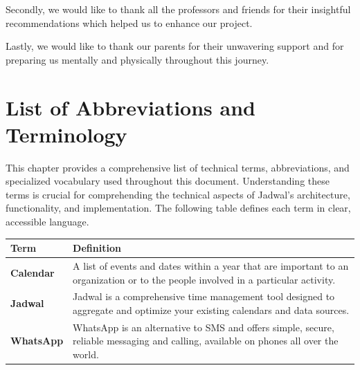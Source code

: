 \documentclass[12pt,a4paper]{report}
\begin{document}
\begin{singlespace}
\begin{justify}
        Secondly, we would like to thank all the professors and friends for their insightful recommendations which helped us to enhance our project.

        Lastly, we would like to thank our parents for their unwavering support and for preparing us mentally and physically throughout this journey.
    \end{justify}

    \newpage

    \tableofcontents

    \listoffigures

    \listoftables

    \chapter*{List of Abbreviations and Terminology}

    This chapter provides a comprehensive list of technical terms, abbreviations, and specialized vocabulary used throughout this document. Understanding these terms is crucial for comprehending the technical aspects of Jadwal's architecture, functionality, and implementation. The following table defines each term in clear, accessible language.

    \begin{center}
        \begin{longtable}{p{}p{}}
            \toprule
            \textbf{Term}             & \textbf{Definition}                                                                                                                                                          \\
            \midrule
            \endhead

            \textbf{Calendar}         & A list of events and dates within a year that are important to an organization or to the people involved in a particular activity. \cite{def:calendar}                       \\[1ex]

            \textbf{Jadwal}           & Jadwal is a comprehensive time management tool designed to aggregate and optimize your existing calendars and data sources.                                                  \\[1ex]

            \textbf{WhatsApp}         & WhatsApp is an alternative to SMS and offers simple, secure, reliable messaging and calling, available on phones all over the world. \cite{whatsapp-about}                   \\[1ex]


\end{longtable}
\end{center}
\end{singlespace}
\end{document}
